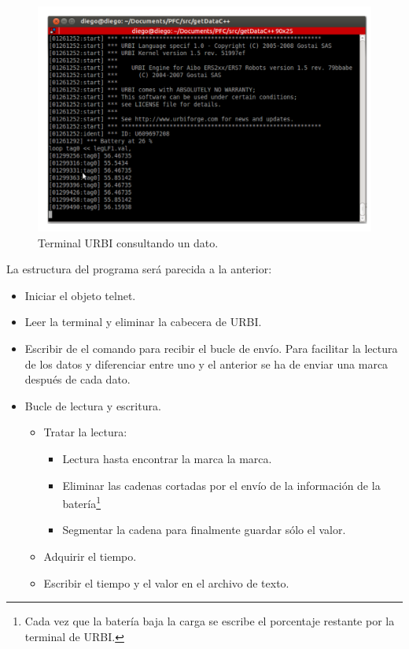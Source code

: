 \documentclass[12pt,a4paper,final,twoside]{book}
\begin{document}
\begin{figure}[h!]
	\centering
    \includegraphics[scale=0.65]{images/telnet.pdf}
	 \caption{Terminal URBI consultando un dato.}
  \label{fig:telnet}
\end{figure}

La estructura del programa será parecida a la anterior:

\begin{itemize}
\item Iniciar el objeto telnet.
\item Leer la terminal y eliminar la cabecera de URBI.
\item Escribir de el comando para recibir el bucle  de envío. Para facilitar la lectura de los datos y diferenciar entre uno y el anterior se ha de enviar una marca después de cada dato.
\item Bucle de lectura y escritura.
\begin{itemize}
\item Tratar la lectura:
\begin{itemize}
\item Lectura hasta encontrar la marca la marca.
\item Eliminar las cadenas cortadas por el envío de la información de la batería\footnote{Cada vez que la batería baja la carga se escribe el porcentaje restante por la terminal de URBI.}
\item Segmentar la cadena para finalmente guardar sólo el valor.
\end{itemize}
\item Adquirir el tiempo.
\item Escribir el tiempo y el valor en el archivo de texto.
\end{itemize} 
\end{itemize}
\end{document}
